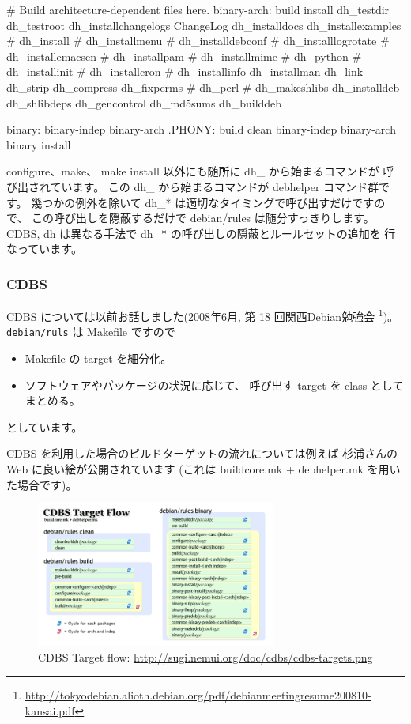 \documentclass[mingoth,a4paper]{jsarticle}
\begin{document}
\begin{commandline}
# Build architecture-dependent files here.
binary-arch: build install
        dh_testdir
        dh_testroot
        dh_installchangelogs ChangeLog
        dh_installdocs
        dh_installexamples
#       dh_install
#       dh_installmenu
#       dh_installdebconf
#       dh_installlogrotate
#       dh_installemacsen
#       dh_installpam
#       dh_installmime
#       dh_python
#       dh_installinit
#       dh_installcron
#       dh_installinfo
        dh_installman
        dh_link
        dh_strip
        dh_compress
        dh_fixperms
#       dh_perl
#       dh_makeshlibs
        dh_installdeb
        dh_shlibdeps
        dh_gencontrol
        dh_md5sums
        dh_builddeb

binary: binary-indep binary-arch
.PHONY: build clean binary-indep binary-arch binary install    
\end{commandline}
configure、make、 make install 以外にも随所に dh\_ から始まるコマンドが
呼び出されています。
%
この dh\_ から始まるコマンドが debhelper コマンド群です。
%
幾つかの例外を除いて dh\_* は適切なタイミングで呼び出すだけですので、
この呼び出しを隠蔽するだけで debian/rules は随分すっきりします。
CDBS, dh は異なる手法で dh\_* の呼び出しの隠蔽とルールセットの追加を
行なっています。

\subsubsection{CDBS}

CDBS については以前お話しました(2008年6月, 第 18 回関西Debian勉強会%
\footnote{\url{http://tokyodebian.alioth.debian.org/pdf/debianmeetingresume200810-kansai.pdf}})。{\tt debian/ruls} は Makefile ですので
\begin{itemize}
      \item Makefile の target を細分化。
      \item ソフトウェアやパッケージの状況に応じて、
    呼び出す target を class としてまとめる。
\end{itemize}
としています。

CDBS を利用した場合のビルドターゲットの流れについては例えば
杉浦さんの Web に良い絵が公開されています
(これは buildcore.mk + debhelper.mk を用いた場合です)。
\begin{figure}[h]
    \centering
    \includegraphics[width=0.7\textwidth]{./image201006/cdbs-targets.png}
    \caption{%
      CDBS Target flow:
      \url{http://sugi.nemui.org/doc/cdbs/cdbs-targets.png}}
    \label{fig:CDBSTargetFlow}
\end{figure}
\end{document}
